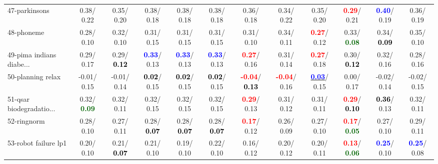 \begin{table}[h]
\begin{center}
{\begin{tabular}{lc|c|c|c|c|c|c|c|c|c|c}
47-parkinsons &   0.38/  0.22 &   0.35/  0.20 &   0.38/  0.18 &   0.38/  0.18 &   0.38/  0.18 &   0.36/  0.18 &   0.34/  0.22 &   0.35/  0.20 & \textcolor{red}{\textbf{  0.29}}/  0.21 & \textcolor{blue}{\textbf{  0.40}}/  0.19 &   0.36/  0.19 \\
48-phoneme &   0.28/  0.10 &   0.32/  0.10 &   0.31/  0.15 &   0.31/  0.15 &   0.31/  0.15 &   0.31/  0.10 &   0.34/  0.11 & \textcolor{red}{\textbf{  0.27}}/  0.12 &   0.33/\textcolor{darkgreen}{\textbf{  0.08}} &   0.34/\textcolor{black}{\textbf{  0.09}} &   0.35/  0.10 \\
49-pima indians diabe... &   0.29/  0.17 &   0.29/\textcolor{black}{\textbf{  0.12}} & \textcolor{blue}{\textbf{  0.33}}/  0.13 & \textcolor{blue}{\textbf{  0.33}}/  0.13 & \textcolor{blue}{\textbf{  0.33}}/  0.13 & \textcolor{red}{\textbf{  0.27}}/  0.16 &   0.31/  0.14 & \textcolor{red}{\textbf{  0.27}}/  0.18 &   0.30/\textcolor{black}{\textbf{  0.12}} &   0.32/  0.16 &   0.28/  0.16 \\
50-planning relax &  -0.01/  0.15 &  -0.01/  0.14 & \textcolor{black}{\textbf{  0.02}}/  0.15 & \textcolor{black}{\textbf{  0.02}}/  0.15 & \textcolor{black}{\textbf{  0.02}}/  0.15 & \textcolor{red}{\textbf{ -0.04}}/\textcolor{black}{\textbf{  0.13}} & \textcolor{red}{\textbf{ -0.04}}/  0.16 & \underline{\textcolor{blue}{\textbf{  0.03}}}/  0.15 &   0.00/  0.17 &  -0.02/  0.14 &  -0.02/  0.15 \\
51-qsar biodegradatio... &   0.32/\textcolor{darkgreen}{\textbf{  0.09}} &   0.32/  0.11 &   0.32/  0.15 &   0.32/  0.15 &   0.32/  0.15 & \textcolor{red}{\textbf{  0.29}}/  0.13 &   0.31/  0.12 &   0.31/  0.11 & \textcolor{red}{\textbf{  0.29}}/\textcolor{black}{\textbf{  0.10}} & \textcolor{black}{\textbf{  0.36}}/  0.13 &   0.32/  0.11 \\
52-ringnorm &   0.28/  0.10 &   0.27/  0.11 &   0.28/\textcolor{black}{\textbf{  0.07}} &   0.28/\textcolor{black}{\textbf{  0.07}} &   0.28/\textcolor{black}{\textbf{  0.07}} & \textcolor{red}{\textbf{  0.17}}/  0.12 &   0.26/  0.09 &   0.27/  0.10 & \textcolor{red}{\textbf{  0.17}}/\textcolor{darkgreen}{\textbf{  0.05}} &   0.27/  0.10 &   0.29/  0.11 \\
53-robot failure lp1 &   0.20/  0.10 &   0.21/\textcolor{black}{\textbf{  0.07}} &   0.21/  0.10 &   0.19/  0.10 &   0.22/  0.10 &   0.16/  0.12 &   0.20/  0.12 &   0.20/  0.11 & \textcolor{red}{\textbf{  0.13}}/\textcolor{darkgreen}{\textbf{  0.06}} & \textcolor{blue}{\textbf{  0.25}}/  0.10 & \textcolor{blue}{\textbf{  0.25}}/  0.08 \\ \hline

\end{tabular}}
\end{center}
\end{table}
